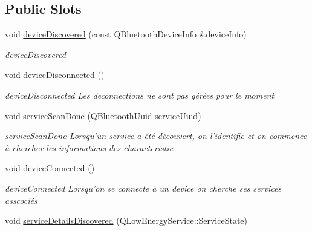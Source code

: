 \subsection*{Public Slots}
\begin{DoxyCompactItemize}
\item 
void \hyperlink{classDevice_ae52006b42aa38769c6d30dc12c83668a}{device\-Discovered} (const Q\-Bluetooth\-Device\-Info \&device\-Info)
\begin{DoxyCompactList}\small\item\em device\-Discovered \end{DoxyCompactList}\item 
\hypertarget{classDevice_a8aa8ff0486557a7ed117766f24a077b7}{void \hyperlink{classDevice_a8aa8ff0486557a7ed117766f24a077b7}{device\-Disconnected} ()}\label{classDevice_a8aa8ff0486557a7ed117766f24a077b7}

\begin{DoxyCompactList}\small\item\em device\-Disconnected Les deconnections ne sont pas gérées pour le moment \end{DoxyCompactList}\item 
\hypertarget{classDevice_a421f7ceff3256ea79de2f316aeace553}{void \hyperlink{classDevice_a421f7ceff3256ea79de2f316aeace553}{service\-Scan\-Done} (Q\-Bluetooth\-Uuid service\-Uuid)}\label{classDevice_a421f7ceff3256ea79de2f316aeace553}

\begin{DoxyCompactList}\small\item\em service\-Scan\-Done Lorsqu'un service a été découvert, on l'identifie et on commence à chercher les informations des characteristic \end{DoxyCompactList}\item 
\hypertarget{classDevice_ac6cad0d2107e449c9027b2baf60418f2}{void \hyperlink{classDevice_ac6cad0d2107e449c9027b2baf60418f2}{device\-Connected} ()}\label{classDevice_ac6cad0d2107e449c9027b2baf60418f2}

\begin{DoxyCompactList}\small\item\em device\-Connected Lorsqu'on se connecte à un device on cherche ses services asscociés \end{DoxyCompactList}\item 
\hypertarget{classDevice_a1770e7dab50cb12e4ca64fd8c35a9eb7}{void \hyperlink{classDevice_a1770e7dab50cb12e4ca64fd8c35a9eb7}{service\-Details\-Discovered} (Q\-Low\-Energy\-Service\-::\-Service\-State)}\label{classDevice_a1770e7dab50cb12e4ca64fd8c35a9eb7}


\end{DoxyCompactItemize}
